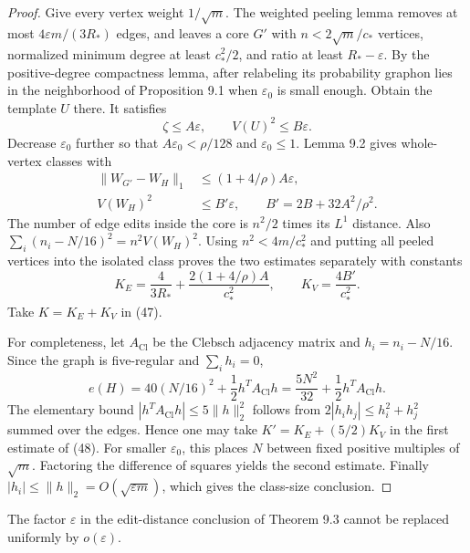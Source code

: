 \begin{proof}
Give every vertex weight $1/\sqrt m$. The weighted peeling lemma removes
at most $4\varepsilon m/(3R_\ast)$ edges, and leaves a core $G'$ with
$n<2\sqrt m/c_\ast$ vertices, normalized minimum degree at least
$c_\ast^2/2$, and ratio at least $R_\ast-\varepsilon$. By the positive-degree
compactness lemma, after relabeling its probability graphon lies in the
neighborhood of Proposition 9.1 when $\varepsilon_0$ is small enough.
Obtain the template $U$ there. It satisfies
\[
 \zeta\leq A\varepsilon,\qquad V(U)^2\leq B\varepsilon.
\]
Decrease $\varepsilon_0$ further so that $A\varepsilon_0<\rho/128$ and
$\varepsilon_0\leq1$. Lemma 9.2 gives whole-vertex classes with
\[
 \begin{split}
 \|W_{G'}-W_H\|_1&\leq(1+4/\rho)A\varepsilon,\\
 V(W_H)^2&\leq B'\varepsilon,\qquad B'=2B+32A^2/\rho^2.
 \end{split}
\]
The number of edge edits inside the core is $n^2/2$ times its $L^1$
distance. Also $\sum_i(n_i-N/16)^2=n^2V(W_H)^2$. Using
$n^2<4m/c_\ast^2$ and putting all peeled vertices into the isolated class
proves the two estimates separately with constants
\[
 K_E=\frac4{3R_\ast}+\frac{2(1+4/\rho)A}{c_\ast^2},\qquad
 K_V=\frac{4B'}{c_\ast^2}.
\]
Take $K=K_E+K_V$ in (47).

For completeness, let $A_{\mathrm{Cl}}$ be the Clebsch adjacency matrix
and $h_i=n_i-N/16$. Since the graph is five-regular and $\sum_i h_i=0$,
\[
 e(H)=40(N/16)^2+\frac12 h^TA_{\mathrm{Cl}}h
 =\frac{5N^2}{32}+\frac12 h^TA_{\mathrm{Cl}}h.
\]
The elementary bound $|h^TA_{\mathrm{Cl}}h|\leq5\|h\|_2^2$ follows from
$2|h_i h_j|\leq h_i^2+h_j^2$ summed over the edges. Hence one may take
$K'=K_E+(5/2)K_V$ in the first estimate of (48). For smaller
$\varepsilon_0$, this places $N$ between fixed positive multiples of
$\sqrt m$. Factoring the difference of squares yields the second estimate.
Finally $|h_i|\leq\|h\|_2=O(\sqrt{\varepsilon m})$, which gives the
class-size conclusion.
\end{proof}

\begin{proposition}
\label{prop:linear-optimality}
The factor $\varepsilon$ in the edit-distance conclusion of Theorem 9.3
cannot be replaced uniformly by $o(\varepsilon)$.
\end{proposition}

